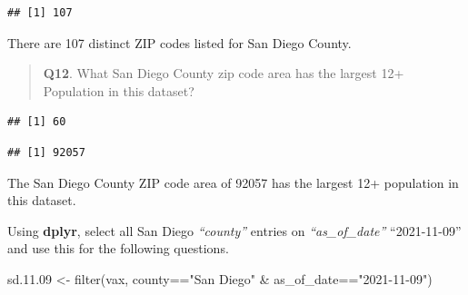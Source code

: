 \documentclass[
]{article}
\newenvironment{Shaded}{\begin{snugshade}}{\end{snugshade}}
\newcommand{\DecValTok}[1]{\textcolor[rgb]{0.00,0.00,0.81}{#1}}
\newcommand{\FloatTok}[1]{\textcolor[rgb]{0.00,0.00,0.81}{#1}}
\newcommand{\FunctionTok}[1]{\textcolor[rgb]{0.00,0.00,0.00}{#1}}
\newcommand{\NormalTok}[1]{#1}
\newcommand{\OtherTok}[1]{\textcolor[rgb]{0.56,0.35,0.01}{#1}}
\newcommand{\SpecialCharTok}[1]{\textcolor[rgb]{0.00,0.00,0.00}{#1}}
\newcommand{\StringTok}[1]{\textcolor[rgb]{0.31,0.60,0.02}{#1}}
\begin{document}
\begin{Shaded}
\end{Shaded}

\begin{verbatim}
## [1] 107
\end{verbatim}

There are 107 distinct ZIP codes listed for San Diego County.

\begin{quote}
\textbf{Q12}. What San Diego County zip code area has the largest 12+
Population in this dataset?
\end{quote}

\begin{Shaded}
\end{Shaded}

\begin{verbatim}
## [1] 60
\end{verbatim}

\begin{Shaded}
\end{Shaded}

\begin{verbatim}
## [1] 92057
\end{verbatim}

The San Diego County ZIP code area of 92057 has the largest 12+
population in this dataset.

Using \textbf{dplyr}, select all San Diego \emph{``county''} entries on
\emph{``as\_of\_date''} ``2021-11-09'' and use this for the following
questions.

\begin{Shaded}
\begin{Highlighting}[]
\NormalTok{sd.}\FloatTok{11.09} \OtherTok{\textless{}{-}} \FunctionTok{filter}\NormalTok{(vax, county}\SpecialCharTok{==}\StringTok{"San Diego"} \SpecialCharTok{\&}\NormalTok{ as\_of\_date}\SpecialCharTok{==}\StringTok{"2021{-}11{-}09"}\NormalTok{)}
\end{Highlighting}
\end{Shaded}
\end{document}
